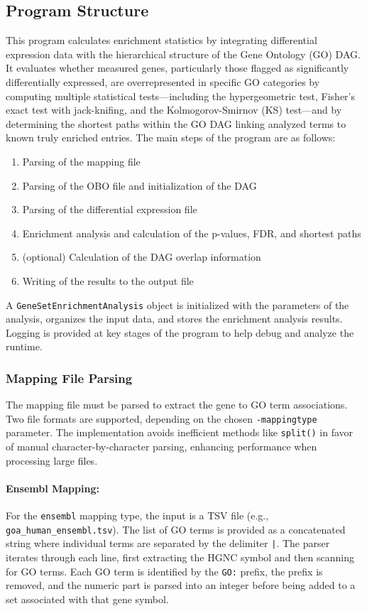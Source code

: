 \documentclass{article}
\begin{document}
    \subsection{Program Structure}\label{subsec:program-structure}
    This program calculates enrichment statistics by integrating differential expression data with the hierarchical structure of the Gene Ontology (GO) DAG. It evaluates whether measured genes, particularly those flagged as significantly differentially expressed, are overrepresented in specific GO categories by computing multiple statistical tests---including the hypergeometric test, Fisher’s exact test with jack-knifing, and the Kolmogorov-Smirnov (KS) test---and by determining the shortest paths within the GO DAG linking analyzed terms to known truly enriched entries. The main steps of the program are as follows:
    \begin{enumerate}
        \item Parsing of the mapping file
        \item Parsing of the OBO file and initialization of the DAG
        \item Parsing of the differential expression file
        \item Enrichment analysis and calculation of the p-values, FDR, and shortest paths
        \item (optional) Calculation of the DAG overlap information
        \item Writing of the results to the output file
    \end{enumerate}
    A \texttt{GeneSetEnrichmentAnalysis} object is initialized with the parameters of the analysis, organizes the input data, and stores the enrichment analysis results. Logging is provided at key stages of the program to help debug and analyze the runtime.

    \subsubsection{Mapping File Parsing}\label{subsubsec:mapping-file-parsing}
    The mapping file must be parsed to extract the gene to GO term associations. Two file formats are supported, depending on the chosen \texttt{-mappingtype} parameter. The implementation avoids inefficient methods like \texttt{split()} in favor of manual character-by-character parsing, enhancing performance when processing large files.

    \paragraph{Ensembl Mapping:}
    For the \texttt{ensembl} mapping type, the input is a TSV file (e.g., \texttt{goa\_human\_ensembl.tsv}). The list of GO terms is provided as a concatenated string where individual terms are separated by the delimiter \texttt{|}. The parser iterates through each line, first extracting the HGNC symbol and then scanning for GO terms. Each GO term is identified by the \texttt{GO:} prefix, the prefix is removed, and the numeric part is parsed into an integer before being added to a set associated with that gene symbol.
\end{document}
